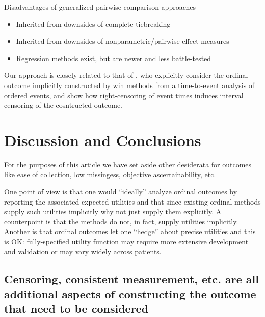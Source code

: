 \documentclass[
  11pt,
  fleqn
]{article}
\begin{document}
Disadvantages of generalized pairwise comparison approaches
\begin{itemize}
  \item Inherited from downsides of complete tiebreaking
  \item Inherited from downsides of nonparametric/pairwise effect measures
  \item Regression methods exist, but are newer and less battle-tested
\end{itemize}

Our approach is closely related to that of
\citet{follmannAnalysisOrderedComposite2020}, who explicitly consider the
ordinal outcome implicitly constructed by win methods from a time-to-event
analysis of ordered events, and show how right-censoring of event times induces
interval censoring of the cosntructed outcome.

\section{Discussion and Conclusions}

For the purposes of this article we have set aside other desiderata for
outcomes like ease of collection, low missingess, objective ascertainability,
etc.

One point of view is that one would ``ideally'' analyze ordinal outcomes by
reporting the associated expected utilities  and that since
existing ordinal methods supply such utilities implicitly why not just supply
them explicitly. A counterpoint is that the methods do not, in fact, supply
utilities implicitly. Another is that ordinal outcomes let one ``hedge'' about
precise utilities and this is OK: fully-specified utility function may require
more extensive development and validation or may vary widely across patients.

\subsection{Censoring, consistent measurement, etc. are all
additional aspects of constructing the outcome that need to be considered}

\newpage

\printbibliography
\end{document}
